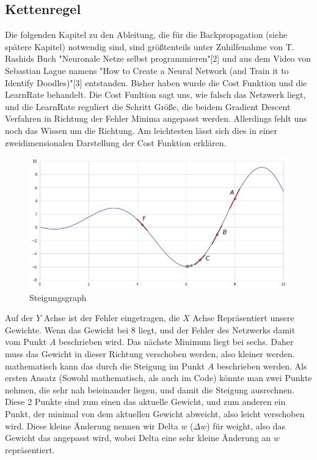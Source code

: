 \documentclass[12pt]{article}
\begin{document}
\subsection{Kettenregel}
Die folgenden Kapitel zu den Ableitung, die für die Backpropagation (siehe spätere Kapitel) notwendig sind, sind größtenteils unter Zuhilfenahme von T. Rashids Buch "Neuronale Netze selbst programmieren"[2] und aus dem Video von Sebastian Lague namens "How to Create a Neural Network (and Train it to Identify Doodles)"[3] entstanden. 
Bisher haben wurde die Cost Funktion und die LearnRate behandelt. Die Cost Funltion sagt uns, wie falsch das Netzwerk liegt, und die LearnRate reguliert die Schritt Größe, die beidem Gradient Descent Verfahren in Richtung der Fehler Minima angepasst werden. Allerdings fehlt uns noch das Wissen um die Richtung. 
Am leichtesten lässt sich dies in einer zweidimensionalen Darstellung der Cost Funktion erklären.
\begin{figure}[H]
\centering
\includegraphics[scale=0.50]{./Images/Pasted image 20230917195146.png}
\caption{Steigungsgraph}
\label{Steigungsgraph}
\end{figure}
Auf der $Y$ Achse ist der Fehler eingetragen, die $X$ Achse Repräsentiert unsere Gewichte. Wenn das Gewicht bei 8 liegt, und der Fehler des Netzwerks damit vom Punkt $A$ beschrieben wird. Das nächste Minimum liegt bei sechs. Daher muss das Gewicht in dieser Richtung verschoben werden, also kleiner werden. 
mathematisch kann das durch die Steigung im Punkt $A$ beschrieben werden. Als ersten Ansatz (Sowohl mathematisch, als auch im Code) könnte man zwei Punkte nehmen, die sehr nah beieinander liegen, und damit die Steigung ausrechnen. Diese 2 Punkte sind zum einen das aktuelle Gewicht, und zum anderen ein Punkt, der minimal von dem aktuellen Gewicht abweicht, also leicht verschoben wird.
Diese kleine Änderung nennen wir Delta $w$ ($\Delta w$) für weight, also das Gewicht das angepasst wird, wobei Delta eine sehr kleine Änderung an $w$ repräsentiert.
\end{document}
